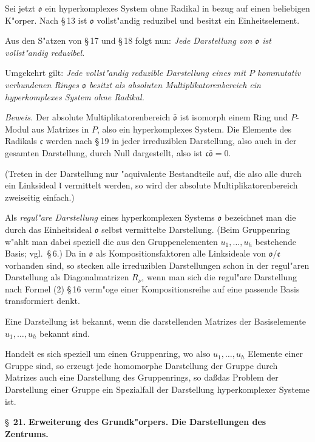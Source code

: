 \documentclass[12pt,a4paper]{article}
\theoremstyle{plain}
\begin{document}
Sei jetzt $\mathfrak{o}$ ein hyperkomplexes System ohne Radikal in bezug auf einen beliebigen K"orper. Nach \S\,13 ist $\mathfrak{o}$ vollst"andig reduzibel und besitzt ein Einheitselement.

Aus den S"atzen von \S\,17 und \S\,18 folgt nun: \textit{Jede Darstellung von $\mathfrak{o}$ ist vollst"andig reduzibel.}

Umgekehrt gilt: \textit{Jede vollst"andig reduzible Darstellung eines mit $P$ kommutativ verbundenen Ringes $\mathfrak{o}$ besitzt als absoluten Multiplikatorenbereich ein hyperkomplexes System ohne Radikal.}

\noindent\textit{Beweis.}
Der absolute Multiplikatorenbereich $\bar{\mathfrak{o}}$ ist isomorph einem Ring und $P$-Modul aus Matrizes in $P$, also ein hyperkomplexes System. Die Elemente des Radikals $\mathfrak{c}$ werden nach \S\,19 in jeder irreduziblen Darstellung, also auch in der gesamten Darstellung, durch Null dargestellt, also ist $\mathfrak{c}\bar{\mathfrak{o}} = 0$.

(Treten in der Darstellung nur "aquivalente Bestandteile auf, die also alle durch ein Linksideal $\mathfrak{l}$ vermittelt werden, so wird der absolute Multiplikatorenbereich zweiseitig einfach.)

Als \textit{regul"are Darstellung} eines hyperkomplexen Systems $\mathfrak{o}$ bezeichnet man die durch das Einheitsideal $\mathfrak{o}$ selbst vermittelte Darstellung. (Beim Gruppenring w"ahlt man dabei speziell die aus den Gruppenelementen $u_1,\ldots,u_h$ bestehende Basis; vgl.\ \S\,6.) Da in $\mathfrak{o}$ als Kompositionsfaktoren alle Linksideale von $\mathfrak{o}/\mathfrak{c}$ vorhanden sind, so stecken alle irreduziblen Darstellungen schon in der regul"aren Darstellung als Diagonalmatrizen $R_\nu$, wenn man sich die regul"are Darstellung nach Formel (2) \S\,16 verm"oge einer Kompositionsreihe auf eine passende Basis transformiert denkt.

Eine Darstellung ist bekannt, wenn die darstellenden Matrizes der Basiselemente $u_1,\ldots,u_h$ bekannt sind.

Handelt es sich speziell um einen Gruppenring, wo also $u_1,\ldots,u_h$ Elemente einer Gruppe sind, so erzeugt jede homomorphe Darstellung der Gruppe durch Matrizes auch eine Darstellung des Gruppenrings, so da\ss das Problem der Darstellung einer Gruppe ein Spezialfall der Darstellung hyperkomplexer Systeme ist.

\newpage
\S~\textbf{21.}
\textbf{Erweiterung des Grundk"orpers. Die Darstellungen des Zentrums.}
\end{document}
